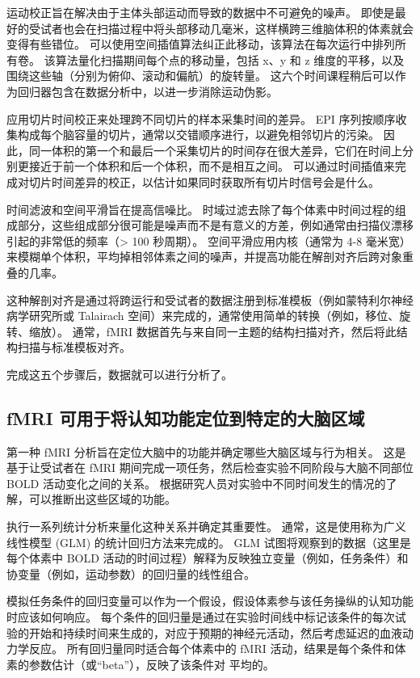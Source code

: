 运动校正旨在解决由于主体头部运动而导致的数据中不可避免的噪声。 即使是最好的受试者也会在扫描过程中将头部移动几毫米，这样横跨三维脑体积的体素就会变得有些错位。 可以使用空间插值算法纠正此移动，该算法在每次运行中排列所有卷。 该算法量化扫描期间每个点的移动量，包括 x、y 和 z 维度的平移，以及围绕这些轴（分别为俯仰、滚动和偏航）的旋转量。 这六个时间课程稍后可以作为回归器包含在数据分析中，以进一步消除运动伪影。

应用切片时间校正来处理跨不同切片的样本采集时间的差异。 EPI 序列按顺序收集构成每个脑容量的切片，通常以交错顺序进行，以避免相邻切片的污染。 因此，同一体积的第一个和最后一个采集切片的时间存在很大差异，它们在时间上分别更接近于前一个体积和后一个体积，而不是相互之间。 可以通过时间插值来完成对切片时间差异的校正，以估计如果同时获取所有切片时信号会是什么。

时间滤波和空间平滑旨在提高信噪比。 时域过滤去除了每个体素中时间过程的组成部分，这些组成部分很可能是噪声而不是有意义的方差，例如通常由扫描仪漂移引起的非常低的频率（> 100 秒周期）。 空间平滑应用内核（通常为 4-8 毫米宽）来模糊单个体积，平均掉相邻体素之间的噪声，并提高功能在解剖对齐后跨对象重叠的几率。

这种解剖对齐是通过将跨运行和受试者的数据注册到标准模板（例如蒙特利尔神经病学研究所或 Talairach 空间）来完成的，通常使用简单的转换（例如，移位、旋转、缩放）。 通常，fMRI 数据首先与来自同一主题的结构扫描对齐，然后将此结构扫描与标准模板对齐。

完成这五个步骤后，数据就可以进行分析了。

\subsection{fMRI 可用于将认知功能定位到特定的大脑区域}
第一种 fMRI 分析旨在定位大脑中的功能并确定哪些大脑区域与行为相关。 这是基于让受试者在 fMRI 期间完成一项任务，然后检查实验不同阶段与大脑不同部位 BOLD 活动变化之间的关系。 根据研究人员对实验中不同时间发生的情况的了解，可以推断出这些区域的功能。

执行一系列统计分析来量化这种关系并确定其重要性。 通常，这是使用称为广义线性模型 (GLM) 的统计回归方法来完成的。 GLM 试图将观察到的数据（这里是每个体素中 BOLD 活动的时间过程）解释为反映独立变量（例如，任务条件）和协变量（例如，运动参数）的回归量的线性组合。

模拟任务条件的回归变量可以作为一个假设，假设体素参与该任务操纵的认知功能时应该如何响应。 每个条件的回归量是通过在实验时间线中标记该条件的每次试验的开始和持续时间来生成的，对应于预期的神经元活动，然后考虑延迟的血液动力学反应。 所有回归量同时适合每个体素中的 fMRI 活动，结果是每个条件和体素的参数估计（或“beta”），反映了该条件对 平均的。

